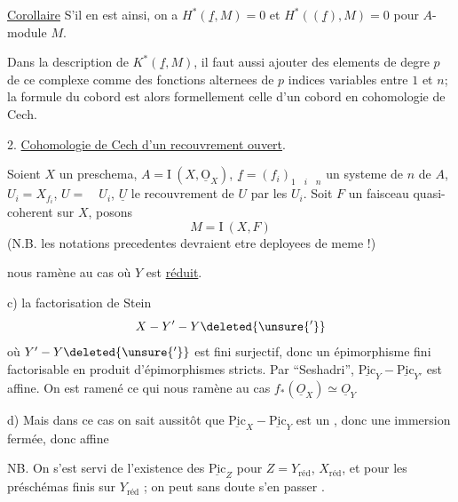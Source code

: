 \uline{Corollaire} S'il en est ainsi, on a $H^{*}(\underline f,M)=0$ et $H^{*}((\underline f),M)=0$ pour  $A$-module $M$.

Dans la description de $K^{*}(\underline f,M)$, il faut aussi ajouter  des elements de degre $p$ de ce complexe comme des fonctions alternees de $p$ indices variables entre $1$ et $n$; la formule du cobord est alors formellement celle d'un cobord en cohomologie de Cech.

2. \uline{Cohomologie de Cech d'un recouvrement ouvert}.

Soient $X$ un preschema, $A=\mathrm{I}\ (X,\underline{\mathrm O}_{X})$, $\underline f=(f_i)_{1\quad i\quad n}$ un systeme de $n$  de $A$, $U_i=X_{f_i}$, $U=\quad U_i$, $\underline U$ le recouvrement de $U$ par les $U_i$. Soit $F$ un faisceau quasi-coherent sur $X$, posons
\[
M=\mathrm{I}\ (X,F)
\]
(N.B. les notations precedentes devraient etre deployees de meme !)

 nous ramène au cas où $Y$ est \uline{réduit}.

c)  la factorisation de Stein
\[
X-Y'-Y\deleted{\unsure{'}}
\]
où $Y'-Y\deleted{\unsure{'}}$ est fini surjectif, donc un épimorphisme fini factorisable en produit d'épimorphismes stricts. Par ``Seshadri'', $\underline{\mathrm{Pic}}_{Y}-\underline{\mathrm{Pic}}_{Y'}$ est affine. On est ramené  ce qui nous ramène au cas $f_{*}(\underline O_X)\simeq \underline O_Y$

d) Mais dans ce cas on sait aussitôt que $\underline{\mathrm{Pic}}_X-\underline{\mathrm{Pic}}_Y$ est un , donc  une immersion fermée, donc affine


NB. On s'est servi de l'existence des $\underline{\mathrm{Pic}}_Z$ pour $Z=Y_{\mathrm{réd}}$, $X_{\mathrm{réd}}$, et pour les préschémas finis sur $Y_{\mathrm{réd}}$ ;  on peut sans doute s'en passer \unsure{\textemdash]|(?)\textnormal{]}}.

